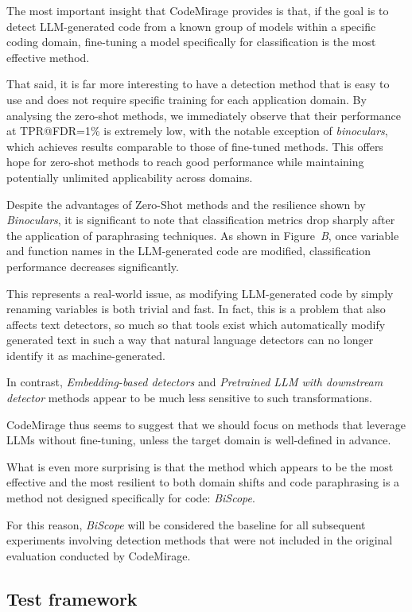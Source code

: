 The most important insight that CodeMirage provides is that, if the 
goal is to detect LLM-generated code from a known group of models 
within a specific coding domain, fine-tuning a model specifically for 
classification is the most effective method.

That said, it is far more interesting to have a detection method that 
is easy to use and does not require specific training for each 
application domain. By analysing the zero-shot methods, we 
immediately observe that their performance at TPR@FDR=1\% is 
extremely low, with the notable exception of \textit{binoculars}, 
which achieves results comparable to those of fine-tuned methods. 
This offers hope for zero-shot methods to reach good performance 
while maintaining potentially unlimited applicability across domains.

Despite the advantages of Zero-Shot methods and the resilience shown 
by \textit{Binoculars}, it is significant to note that classification 
metrics drop sharply after the application of paraphrasing techniques. 
As shown in Figure~\textit{B}, once variable and function names in the 
LLM-generated code are modified, classification performance decreases 
significantly.

This represents a real-world issue, as modifying LLM-generated code by 
simply renaming variables is both trivial and fast. In fact, this is a 
problem that also affects text detectors, so much so that tools exist 
which automatically modify generated text in such a way that natural 
language detectors can no longer identify it as machine-generated.

In contrast, \textit{Embedding-based detectors} and \textit{Pretrained 
LLM with downstream detector} methods appear to be much less sensitive 
to such transformations.

CodeMirage thus seems to suggest that we should focus on methods that 
leverage LLMs without fine-tuning, unless the target domain is 
well-defined in advance.

What is even more surprising is that the method which 
appears to be the most effective and the most resilient to 
both domain shifts and code paraphrasing is a method not 
designed specifically for code: \textit{BiScope}. 

For this reason, \textit{BiScope} will be considered the 
baseline for all subsequent experiments involving detection 
methods that were not included in the original evaluation 
conducted by CodeMirage.


\subsection{Test framework}
